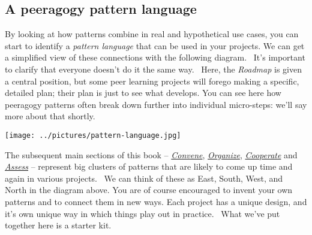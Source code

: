 

\subsection{A peeragogy pattern language}

By looking at how patterns combine in real and hypothetical use cases,
you can start to identify a \emph{pattern language} that can be used in
your projects. We can get a simplified view of these connections with
the following diagram.~ It's important to clarify that everyone doesn't
do it the same way.~ Here, the \emph{Roadmap} is given a central
position, but some peer learning projects will forego making a specific,
detailed plan; their plan is just to see what develops. You can see here
how peeragogy patterns often break down further into individual
micro-steps: we'll say more about that shortly.

{\centering
\texttt{[image: ../pictures/pattern-language.jpg]}\par}

The subsequent main sections of this book --
\href{http://peeragogy.org/convene/}{\emph{Convene}},
\href{http://peeragogy.org/organize/}{\emph{Organize}},
\href{http://peeragogy.org/facilitate/}{\emph{Cooperate}} and
\href{http://peeragogy.org/assessment/}{\emph{Assess}} -- represent big
clusters of patterns that are likely to come up time and again in
various projects.~ We can think of these as East, South, West, and North
in the diagram above. You are of course encouraged to invent your own
patterns and to connect them in new ways. Each project has a unique
design, and it's own unique way in which things play out in practice.~
What we've put together here is a starter kit.

